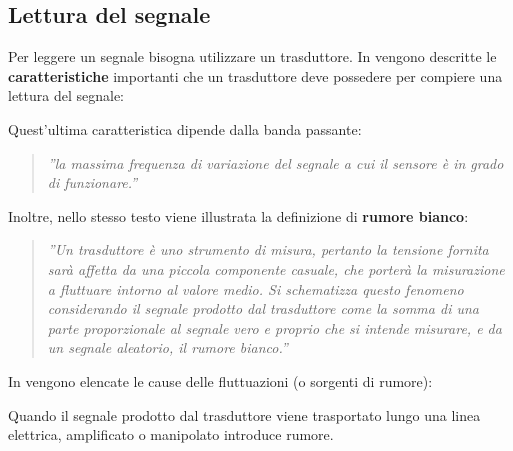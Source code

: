 \documentclass[a4paper]{report} %
\begin{document}
\subsection{Lettura del segnale}
Per leggere un segnale bisogna utilizzare un trasduttore. In \cite{art:rif.2} vengono descritte le \textbf{caratteristiche} importanti che un trasduttore deve possedere per compiere una lettura del segnale: 
\begin{quote}
\end{quote}
Quest'ultima caratteristica dipende dalla banda passante:
\begin{quote}
	\textit{''la massima frequenza di variazione del segnale a cui il sensore è in grado di funzionare.''} 
\end{quote}
Inoltre, nello stesso testo viene illustrata la definizione di \textbf{rumore bianco}:
\begin{quote}
	\textit{''Un trasduttore è uno strumento di misura, pertanto la tensione fornita sarà affetta da una piccola componente casuale, che porterà la misurazione a fluttuare intorno al valore medio. Si schematizza questo fenomeno considerando il segnale prodotto dal trasduttore come la somma di una parte proporzionale al segnale vero e proprio che si intende misurare, e da un segnale aleatorio, il rumore bianco.''}	
\end{quote}
In \cite{art:rif.2} vengono elencate le cause delle fluttuazioni (o sorgenti di rumore):
\begin{quote}	
\end{quote}
Quando il segnale prodotto dal trasduttore viene trasportato lungo una linea elettrica, amplificato o manipolato introduce rumore.
\end{document}
